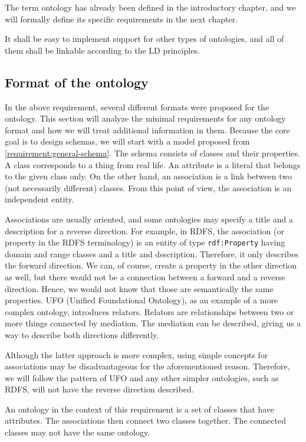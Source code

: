 The term ontology has already been defined in the introductory chapter, and we will formally define its specific requirements in the next chapter.

It shall be easy to implement support for other types of ontologies, and all of them shall be linkable according to the LD principles.

\subsection{Format of the ontology}

In the above requirement, several different formats were proposed for the ontology. This section will analyze the minimal requirements for any ontology format and how we will treat additional information in them. Because the core goal is to design schemas, we will start with a model proposed from \autoref{requirement:general-schema}. The schema consists of classes and their properties. A class corresponds to a thing from real life. An attribute is a literal that belongs to the given class only. On the other hand, an association is a link between two (not necessarily different) classes. From this point of view, the association is an independent entity.

Associations are usually oriented, and some ontologies may specify a title and a description for a reverse direction. For example, in RDFS, the association (or property in the RDFS terminology) is an entity of type {\tt rdf:Property} having domain and range classes and a title and description. Therefore, it only describes the forward direction. We can, of course, create a property in the other direction as well, but there would not be a connection between a forward and a reverse direction. Hence, we would not know that those are semantically the same properties. UFO (Unified Foundational Ontology), as an example of a more complex ontology, introduces relators. Relators are relationships between two or more things connected by mediation. The mediation can be described, giving us a way to describe both directions differently.

Although the latter approach is more complex, using simple concepts for associations may be disadvantageous for the aforementioned reason. Therefore, we will follow the pattern of UFO and any other simpler ontologies, such as RDFS, will not have the reverse direction described.

\medskip

An ontology in the context of this requirement is a set of classes that have attributes. The associations then connect two classes together. The connected classes may not have the same ontology.

